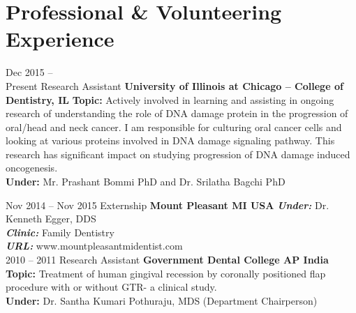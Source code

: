 \documentclass[]{friggeri-cv} %
\begin{document}
\section{Professional \& Volunteering Experience}
\begin{entrylist}

\entry
{Dec 2015 -- \\Present}
{\large Research Assistant}
{\bf University of Illinois at Chicago -- College of Dentistry, IL}
{
	{\bf Topic: }Actively involved in learning and assisting in ongoing research of understanding the role of DNA damage protein in the progression of oral/head and neck cancer. I am responsible for culturing oral cancer cells and looking at various proteins involved in DNA damage signaling pathway. This research has significant impact on studying progression of DNA damage induced oncogenesis. \\
	{\bf Under: } Mr. Prashant Bommi PhD and Dr. Srilatha Bagchi PhD \\
}

\entry
{Nov 2014 -- Nov 2015}
{\large Externship}
{\bf Mount Pleasant MI USA}
{
	\emph{\bf Under: } Dr. Kenneth Egger, DDS\\
	\emph{\bf Clinic: } Family Dentistry\\
	\emph{\bf URL: }www.mountpleasantmidentist.com
}
\\
\entry
{2010 -- 2011}
{\large Research Assistant}
{\bf Government Dental College AP India}
{
	{\bf Topic: } Treatment of human gingival recession by coronally positioned flap procedure with or without GTR- a clinical study.\\
	{\bf Under: } Dr. Santha Kumari Pothuraju, MDS (Department Chairperson)\\
}


\end{entrylist}
\end{document}
